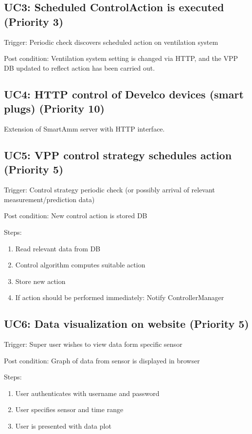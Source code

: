 \subsection*{UC3: Scheduled ControlAction is executed (Priority 3)}
\noindent Trigger: Periodic check discovers scheduled action on ventilation system

\noindent Post condition: Ventilation system setting is changed via HTTP, and the VPP DB updated to reflect action has been carried out.

\subsection*{UC4: HTTP control of Develco devices (smart plugs) (Priority 10)}
Extension of SmartAmm server with HTTP interface.

\subsection*{UC5: VPP control strategy schedules action (Priority 5)}
\noindent Trigger: Control strategy periodic check (or possibly arrival of relevant measurement/prediction data)

\noindent Post condition: New control action is stored DB

\noindent Steps: 
\begin{enumerate}
    \item Read relevant data from DB
    \item Control algorithm computes suitable action
    \item Store new action
    \item If action should be performed immediately: Notify ControllerManager
\end{enumerate}

\subsection*{UC6: Data visualization on website (Priority 5)}
\noindent Trigger: Super user wishes to view data form specific sensor

\noindent Post condition: Graph of data from sensor is displayed in browser

\noindent Steps: 
\begin{enumerate}
    \item User authenticates with username and password
    \item User specifies sensor and time range
    \item User is presented with data plot
\end{enumerate}

